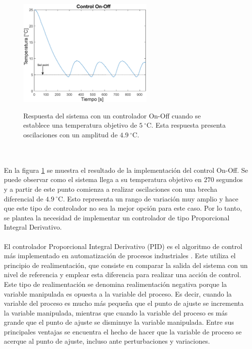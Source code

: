 \begin{figure}[h!]
\begin{centering}
    \caption{Respuesta del sistema con un controlador On-Off cuando se establece una temperatura objetivo de $5~^\circ \mbox{C}$. Esta respuesta presenta oscilaciones con un amplitud de $4.9~^\circ \mbox{C}$.}
  \includegraphics[width=0.6\textwidth]{Images/ControlOnOff.eps}
    \label{fig:ControlOnOff}
  \par\end{centering}
\end{figure}
\\ \\
En la figura \ref{fig:ControlOnOff} se muestra el resultado de la implementación del control On-Off. Se puede observar como el sistema llega a su temperatura objetivo en $270$ segundos y a partir de este punto comienza a realizar oscilaciones con una brecha diferencial de $4.9~^\circ \mbox{C}$. Esto representa un rango de variación muy amplio y hace que este tipo de controlador no sea la mejor opción para este caso. Por lo tanto, se plantea la necesidad de implementar un controlador de tipo Proporcional Integral Derivativo.\\ \\
El controlador  Proporcional Integral Derivativo (PID) es el algoritmo de control más implementado en automatización de procesos industriales \citep{Astrom}. Este  utiliza el principio de realimentación, que consiste en comparar la salida del sistema con un nivel de referencia y emplear esta diferencia para realizar una acción de control. Este tipo de realimentación se denomina realimentación negativa porque la variable manipulada es opuesta a la variable del proceso. Es decir, cuando la variable del proceso es mucho más pequeña que el punto de ajuste se incrementa la variable manipulada, mientras que cuando la variable del proceso es más grande que el punto de ajuste se disminuye la variable manipulada. Entre sus principales ventajas se encuentra el hecho de hacer que la variable  de proceso se acerque al punto de ajuste,  incluso ante perturbaciones y variaciones.\\ \\
